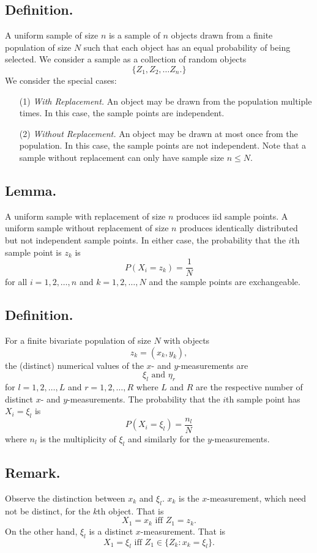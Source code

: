 \documentclass[titlepage]{article}
\begin{document}
\subsection{Definition.} A uniform sample of size $n$ is a sample of $n$ objects drawn from a finite population of size $N$ such that each object has an equal probability of being selected. We consider a sample as a collection of random objects 
$$\{Z_{1}, Z_{2}, \ldots Z_{n}.\}$$
We consider the special cases:
\begin{enumerate}
\item[(1)] \textit{With Replacement.} An object may be drawn from the population multiple times. In this case, the sample points are independent.
\item[(2)] \textit{Without Replacement.} An object may be drawn at most once from the population. In this case, the sample points are not independent. Note that a sample without replacement can only have sample size $n \leq N$.
\end{enumerate}

\subsection{Lemma.} A uniform sample with replacement of size $n$ produces iid sample points. A uniform sample without replacement of size $n$ produces identically distributed but not independent sample points. In either case, the probability that the $i$th sample point is $z_{k}$ is
$$P(X_{i} = z_{k}) = \frac{1}{N}$$
for all $i = 1, 2, \ldots, n$ and $k = 1, 2, \ldots, N$ and the sample points are exchangeable.

\subsection{Definition.} For a finite bivariate population of size $N$ with objects 
$$z_{k} = (x_{k}, y_{k}),$$
the (distinct) numerical values of the $x$- and $y$-measurements are 
$$\xi_{l} \text{ and } \eta_{r}$$
for $l = 1, 2, \ldots, L$ and $r = 1, 2, \ldots, R$ where $L$ and $R$ are the respective number of distinct $x$- and $y$-measurements. The probability that the $i$th sample point has $X_{i} = \xi_{l}$ is
$$P(X_{i} = \xi_{l}) = \frac{n_{l}}{N}$$
where $n_{l}$ is the multiplicity of $\xi_{l}$ and similarly for the $y$-measurements.

\subsection{Remark.} Observe the distinction between $x_{k}$ and $\xi_{l}$. $x_{k}$ is the $x$-measurement, which need not be distinct, for the $k$th object. That is 
$$X_{1} = x_{k} \text{ iff } Z_{1} = z_{k}.$$
On the other hand, $\xi_{l}$ is a distinct $x$-measurement. That is 
$$X_{1} = \xi_{l} \text{ iff } Z_{1} \in \{Z_{k} : x_{k} = \xi_{l}\}.$$
\end{document}
